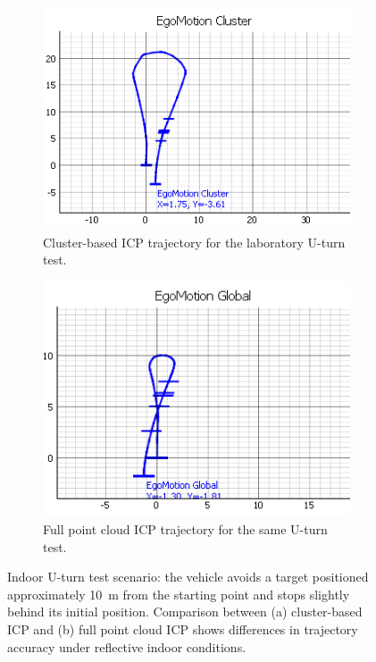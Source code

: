 \begin{figure}[!htbp]
    \centering
    \begin{subfigure}{0.48\linewidth}
        \centering
        \includegraphics[width=\linewidth]{images/labDriveAroundICP_Cluster1.png}
        \caption{Cluster-based ICP trajectory for the laboratory U-turn test.}
        \label{fig:labDriveAroundClustered}
    \end{subfigure}
    \hfill
    \begin{subfigure}{0.48\linewidth}
        \centering
        \includegraphics[width=\linewidth]{images/labDriveAroundICP_Full1.png}
        \caption{Full point cloud ICP trajectory for the same U-turn test.}
        \label{fig:labDriveAroundFull}
    \end{subfigure}
    \caption{Indoor U-turn test scenario: the vehicle avoids a target positioned approximately \SI{10}{\meter} from the starting point and stops slightly behind its initial position.  
    Comparison between (a) cluster-based ICP and (b) full point cloud ICP shows differences in trajectory accuracy under reflective indoor conditions.}
    \label{fig:labDriveAround}
\end{figure}


